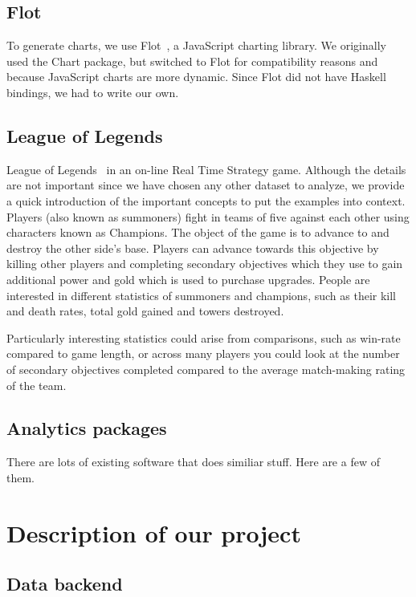 \documentclass{chi2009}
\begin{document}
\subsection{Flot}

To generate charts, we use Flot~\cite{flot}, a JavaScript charting library. We originally used the Chart package, but switched to Flot for compatibility reasons and because JavaScript charts are more dynamic. Since Flot did not have Haskell bindings, we had to write our own. 

\subsection{League of Legends}

League of Legends~\cite{lol} in an on-line Real Time Strategy game. Although the details are not important since we have chosen any other dataset to analyze, we provide a quick introduction of the important concepts to put the examples into context. Players (also known as summoners) fight in teams of five against each other using characters known as Champions. The object of the game is to advance to and destroy the other side's base. Players can advance towards this objective by killing other players and completing secondary objectives which they use to gain additional power and gold which is used to purchase upgrades. People are interested in different statistics of summoners and champions, such as their kill and death rates, total gold gained and towers destroyed.

Particularly interesting statistics could arise from comparisons, such as win-rate compared to game length, or across many players you could look at the number of secondary objectives completed compared to the average match-making rating of the team.

\subsection{Analytics packages}

There are lots of existing software that does similiar stuff. Here are a few of them. 

\section{Description of our project}
\label{package}

\subsection{Data backend}
\end{document}
